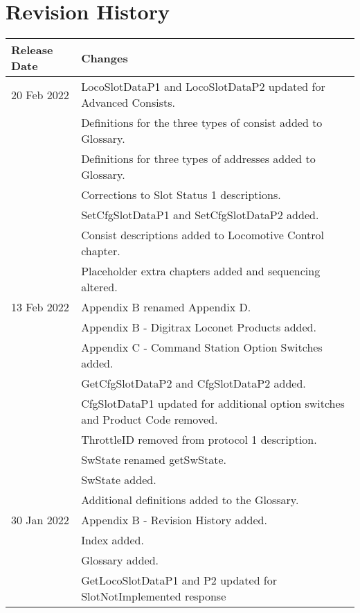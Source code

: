  

\chapter[Revision History]{Revision History}

\begin{tabular}{|p{3cm}|p{13cm}|}
\hline
\textbf{Release Date} & \textbf{Changes} \\
\hline
20 Feb 2022 & LocoSlotDataP1 and LocoSlotDataP2 updated for Advanced Consists.\\
& Definitions for the three types of consist added to Glossary.\\
& Definitions for three types of addresses added to Glossary.\\
& Corrections to Slot Status 1 descriptions.\\
& SetCfgSlotDataP1 and SetCfgSlotDataP2 added.\\
& Consist descriptions added to Locomotive Control chapter.\\
& Placeholder extra chapters added and sequencing altered.\\
\hline
13 Feb 2022 & Appendix B renamed Appendix D.\\
& Appendix B - Digitrax Loconet Products added.\\
& Appendix C - Command Station Option Switches added.\\
& GetCfgSlotDataP2 and CfgSlotDataP2 added.\\
& CfgSlotDataP1 updated for additional option switches and Product Code removed.\\
& ThrottleID removed from protocol 1 description.\\
& SwState renamed getSwState.\\
& SwState added.\\
& Additional definitions added to the Glossary.\\
\hline
30 Jan 2022 & Appendix B - Revision History added.\\
& Index added.\\
& Glossary added.\\
& GetLocoSlotDataP1 and P2 updated for SlotNotImplemented response\\

\end{tabular}
